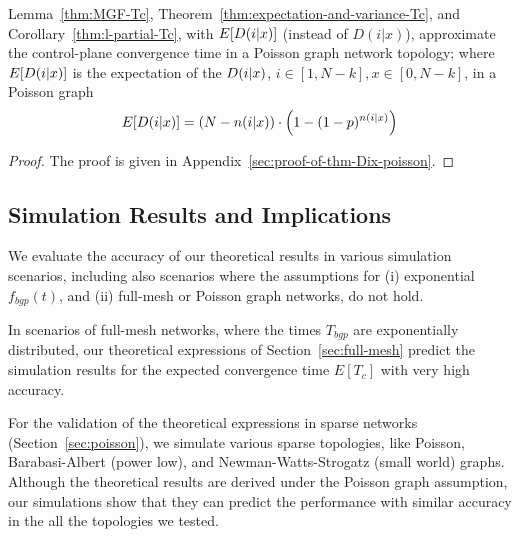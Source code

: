 \begin{result}\label{thm:Dix-poisson} Lemma~\ref{thm:MGF-Tc}, Theorem~\ref{thm:expectation-and-variance-Tc}, and Corollary~\ref{thm:l-partial-Tc}, with $E[D(i|x)]$ (instead of $D(i|x)$), approximate the control-plane convergence time in a Poisson graph network topology; where $E[D(i|x)]$ is the expectation of the \bgp $D(i|x)$, $i\in[1,N-k], x\in[0,N-k]$, in a Poisson graph 
\begin{equation}
E[D(i|x)] = \left(N-n(i|x)\right) \cdot \left(1-(1-p)^{n(i|x)}\right)
\end{equation}
\end{result}
\begin{proof}
The proof is given in Appendix~\ref{sec:proof-of-thm-Dix-poisson}.
\end{proof}




\subsection{Simulation Results and Implications}\label{sec:control-plane-validation}
We evaluate the accuracy of our theoretical results in various simulation scenarios, including also scenarios where the assumptions for (i) exponential $f_{bgp}(t)$, and (ii) full-mesh or Poisson graph networks, do not hold. %

In scenarios of full-mesh networks, where the times $T_{bgp}$ are exponentially distributed, our theoretical expressions of Section~\ref{sec:full-mesh} predict the simulation results for the expected convergence time $E[T_{c}]$ with very high accuracy. 

For the validation of the theoretical expressions in sparse networks (Section~\ref{sec:poisson}), we simulate various sparse topologies, like Poisson, Barabasi-Albert (power low), and Newman-Watts-Strogatz (small world) graphs. Although the theoretical results are derived under the Poisson graph assumption, our simulations show that they can predict the performance with similar accuracy in the all the topologies we tested. 


